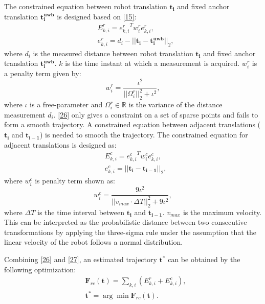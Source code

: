 \documentclass[journal]{IEEEtran}
\begin{document}
The constrained equation between robot translation $\mathbf{t_i}$ and fixed anchor translation $\mathbf{t_i^{uwb}}$ is designed based on \eqref{15}:
\begin{subequations}\label{26}
\begin{align}
 &{E_{k,i}^{r}} = {e_{k,i}^{r}}^{T} w_i^{r} e_{k,i}^{r},\\
& e_{k,i}^{r} = d_i - ||\mathbf {t_i-t_i^{uwb}}||_2,
\end{align}
\end{subequations}
where $d_i$ is the measured distance between robot translation $\mathbf{t_i}$ and fixed anchor translation $\mathbf{t_i^{uwb}}$. $k$ is the time instant at which a measurement is acquired. $w_i^{r}$ is a penalty term given by:
\begin{equation}\label{fa}
w_i^{r} = \frac{\iota^{2}}{||\Omega_i^{r}||_2^{2} + \iota^{2}},   
\end{equation}
where $\iota$ is a free-parameter and $\Omega_i^{r} \in \mathbb{R}$ is the variance of the distance measurement $d_i$. \eqref{26} only gives a constraint on a set of sparse points and fails to form a smooth trajectory. A constrained equation between adjacent translations
($\mathbf{t_i}$ and $\mathbf{t_{i-1}}$) is needed to smooth the trajectory. The constrained equation for adjacent translations is designed as:
\begin{subequations}\label{27}
\begin{align}
&{E_{k,i}^{c}} = {e_{k,i}^{c}}^{T}w_i^{c} e_{k,i}^{c},\\
&e_{k,i}^{c} = ||\mathbf {t_i-t_{i-1}}||_2,
\end{align}
\end{subequations}
where $w_i^{c}$ is penalty term shown as:
\begin{equation}\label{d1}
w_i^{c} = \frac{9\iota^{2}}{||v_{max} \cdot \Delta T||_2^{2} + 9\iota^{2}},
\end{equation}
where $\Delta T$ is the time interval between $\mathbf{t_i}$ and $\mathbf{t_{i-1}}$. ${v_{max}}$ is the maximum velocity. This can be interpreted as the probabilistic distance between two consecutive transformations by applying the three-sigma rule under the assumption that the linear velocity of the robot follows a normal distribution.

Combining \eqref{26} and \eqref{27}, an estimated trajectory $\mathbf{t^*}$ can be obtained by the following optimization:
\begin{subequations}\label{c1}
\begin{align}
&\mathbf F_{rc}(\mathbf t) = \sum_{k,i}(E_{k,i}^{r} + E_{k,i}^{c}), \\
& \mathbf {t^*} = {\arg}\min \mathbf F_{rc}(\mathbf t).
\end{align}
\end{subequations}
\end{document}
